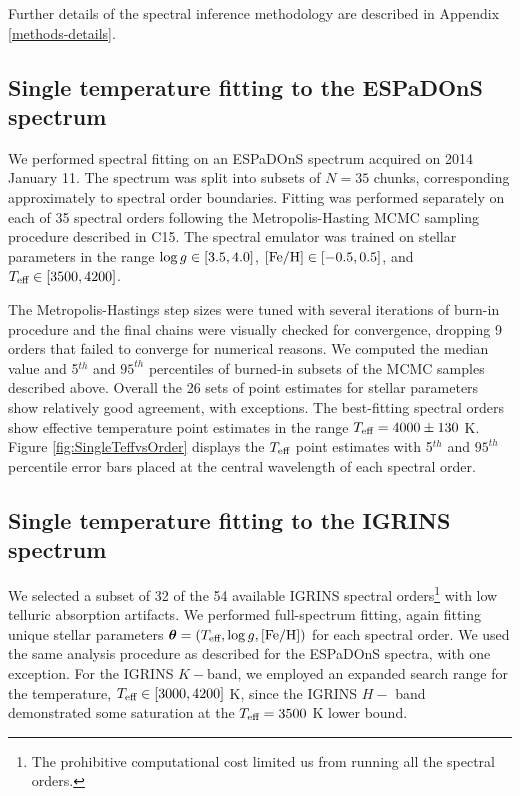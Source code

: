 \documentclass[twocolumn]{emulateapj}%
\newcommand{\iancze}{{\sc C15}}
\begin{document}
Further details of the spectral inference methodology are described in Appendix \ref{methods-details}.


\subsection{Single temperature fitting to the ESPaDOnS spectrum}\label{sec:ESP_starfish}

We performed spectral fitting on an ESPaDOnS spectrum acquired on 2014 January 11.  The spectrum was split into subsets of $N=35$ chunks, corresponding approximately to spectral order boundaries.  Fitting was performed separately on each of 35 spectral orders following the Metropolis-Hasting MCMC sampling procedure described in \iancze.  The spectral emulator was trained on stellar parameters in the range $\log g \in [3.5, 4.0]$, $[{\rm Fe}/{\rm H}] \in [-0.5, 0.5]$, and $T_\textrm{eff} \in [3500, 4200]$.

The Metropolis-Hastings step sizes were tuned with several iterations of burn-in procedure and the final chains were visually checked for convergence, dropping 9 orders that failed to converge for numerical reasons.  We computed the median value and 5$^{th}$ and $95^{th}$ percentiles of burned-in subsets of the MCMC samples described above.  Overall the 26 sets of point estimates for stellar parameters show relatively good agreement, with exceptions.  The best-fitting spectral orders show effective temperature point estimates in the range $T_\textrm{eff}=4000\pm130$ K.  Figure \ref{fig:SingleTeffvsOrder} displays the $T_\textrm{eff}$ point estimates with 5$^{th}$ and $95^{th}$ percentile error bars placed at the central wavelength of each spectral order.

\subsection{Single temperature fitting to the IGRINS spectrum}\label{sec:IGR_starfish}

We selected a subset of 32 of the 54 available IGRINS spectral orders\footnote{The prohibitive computational cost limited us from running all the spectral orders.} with low telluric absorption artifacts.  We performed full-spectrum fitting, again fitting unique stellar parameters ${\bm \theta} = (T_\textrm{eff}, \log g, [{\rm Fe}/{\rm H}])$ for each spectral order.  We used the same analysis procedure as described for the ESPaDOnS spectra, with one exception.  For the IGRINS $K-$band, we employed an expanded search range for the temperature, $T_\textrm{eff} \in [3000, 4200]$ K, since the IGRINS $H-$ band demonstrated some saturation at the $T_\textrm{eff}=3500$ K lower bound.  
\end{document}
